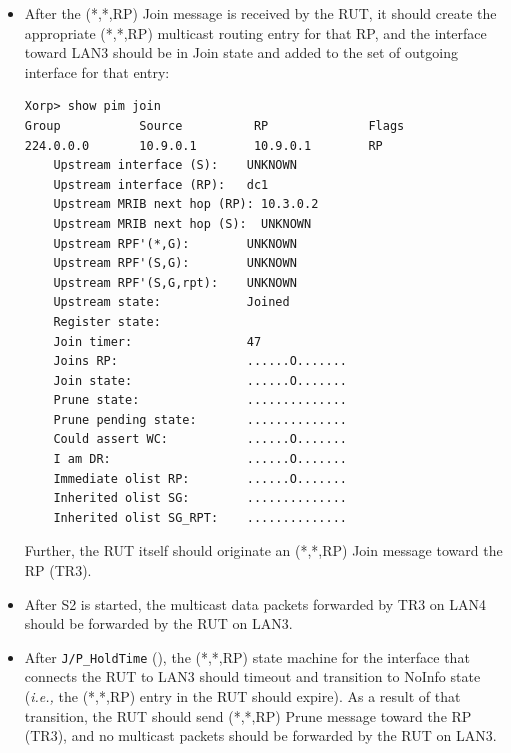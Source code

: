 \documentclass[11pt]{report}
\newcommand{\ie}{\emph{i.e.,}\xspace}
\begin{document}

\begin{itemize}

  \item After the (*,*,RP) Join message is received by the RUT, it
  should create the appropriate (*,*,RP) multicast routing entry for
  that RP, and the interface toward LAN3 should be in Join state and
  added to the set of outgoing interface for that entry:

\begin{verbatim}
Xorp> show pim join 
Group           Source          RP              Flags
224.0.0.0       10.9.0.1        10.9.0.1        RP   
    Upstream interface (S):    UNKNOWN
    Upstream interface (RP):   dc1
    Upstream MRIB next hop (RP): 10.3.0.2
    Upstream MRIB next hop (S):  UNKNOWN
    Upstream RPF'(*,G):        UNKNOWN
    Upstream RPF'(S,G):        UNKNOWN
    Upstream RPF'(S,G,rpt):    UNKNOWN
    Upstream state:            Joined 
    Register state:            
    Join timer:                47
    Joins RP:                  ......O.......
    Join state:                ......O.......
    Prune state:               ..............
    Prune pending state:       ..............
    Could assert WC:           ......O.......
    I am DR:                   ......O.......
    Immediate olist RP:        ......O.......
    Inherited olist SG:        ..............
    Inherited olist SG_RPT:    ..............
\end{verbatim}

  Further, the RUT itself should originate an (*,*,RP) Join message
  toward the RP (TR3).

  \item After S2 is started, the multicast data packets forwarded by TR3
  on LAN4 should be forwarded by the RUT on LAN3.

  \item After \verb=J/P_HoldTime= ({\PimsmJPHoldTime}),
  the (*,*,RP) state machine for the interface that connects the RUT to
  LAN3 should timeout and transition to NoInfo state
  (\ie the (*,*,RP) entry in the RUT should expire).
  As a result of that transition, the RUT should send (*,*,RP) Prune
  message toward the RP (TR3), and no multicast packets should be
  forwarded by the RUT on LAN3.

\end{itemize}

\end{document}
